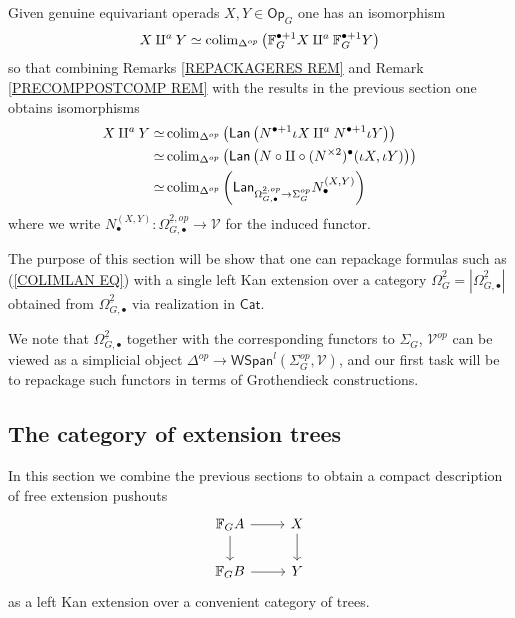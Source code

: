 \documentclass[a4paper,10pt]{article}%
\begin{document}
Given genuine equivariant operads 
$X,Y \in \mathsf{Op}_G$
one has an isomorphism
\[
	X \amalg^a Y 
\simeq
	\operatorname{colim}_{\Delta^{op}} 
	\left(
	\mathbb{F}_G^{\bullet+1} X \amalg^a \mathbb{F}_G^{\bullet+1} Y
	\right)
\]
so that combining Remarks \ref{REPACKAGERES REM}
and
Remark \ref{PRECOMPPOSTCOMP REM}
with the results in the previous section one obtains isomorphisms
\begin{align}
	X \amalg^a Y  
\simeq &
	\operatorname{colim}_{\Delta^{op}} 
	\left(
	\mathsf{Lan} \left(
	N^{\bullet+1} \iota X \amalg^a N^{\bullet+1} \iota Y
	\right) \right)
\\
\simeq &
	\operatorname{colim}_{\Delta^{op}} 
	\left(
	\mathsf{Lan} \left(
	N \circ \amalg \circ (N^{\times 2})^{\bullet} (\iota X,\iota Y)
	\right) \right)
\\ \label{COLIMLAN EQ}
\simeq &
	\operatorname{colim}_{\Delta^{op}} 
	\left(
	\mathsf{Lan}_{\Omega_{G,\bullet}^{\underline{2},op} \to \Sigma_G^{op}}
	N_{\bullet}^{(X,Y)}
	\right)
\end{align}
where we write 
$N_{\bullet}^{(X,Y)} \colon \Omega_{G,\bullet}^{\underline{2},op} \to \mathcal{V}$
for the induced functor.

The purpose of this section will be show that one can repackage 
formulas such as (\ref{COLIMLAN EQ})
with a single left Kan extension over a category
$\Omega_G^{\underline{2}} = |\Omega_{G,\bullet}^{\underline{2}}|$
obtained from 
$\Omega_{G,\bullet}^{\underline{2}}$
via realization in $\mathsf{Cat}$.

We note that $\Omega_{G,\bullet}^{\underline{2}}$ together with the corresponding functors to $\Sigma_G$, $\mathcal{V}^{op}$
can be viewed as a simplicial object 
$\Delta^{op} \to \mathsf{WSpan}^l(\Sigma_G^{op},\mathcal{V})$,
and our first task will be to repackage such functors in terms of Grothendieck constructions.






\subsection{The category of extension trees}\label{EXTTREE SEC}

In this section we combine the previous sections to obtain a compact description of free extension pushouts
\begin{equation}\label{FREEEXT EQ}
\begin{tikzcd}
	\mathbb{F}_G A \ar{r} \ar{d} & X \ar{d}
\\
	\mathbb{F}_G B \ar{r} & Y
\end{tikzcd}
\end{equation}
as a left Kan extension over a convenient category of trees.
\end{document}
